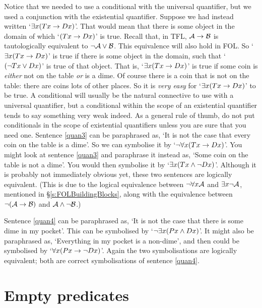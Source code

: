 Notice that we needed to use a conditional with the universal quantifier, but we used a conjunction with the existential quantifier. Suppose we had instead written `$\exists x(Tx \rightarrow Dx)$'. That would mean that there is some object in the domain of which `$(Tx \rightarrow Dx)$' is true. Recall that, in TFL, $\mathcal{A} \rightarrow \mathcal{B}$ is tautologically equivalent to $\neg\mathcal{A} \vee \mathcal{B}$. This equivalence will also hold in FOL. So `$\exists x(Tx \rightarrow Dx)$' is true if there is some object in the domain, such that `$(\neg Tx \vee Dx)$' is true of that object. That is, `$\exists x (Tx \rightarrow Dx)$' is true if some coin is \emph{either} not on the table \emph{or} is a dime. Of course there is a coin that is not on the table: there are coins lots of other places. So it is \emph{very easy} for `$\exists x(Tx \rightarrow Dx)$' to be true. A conditional will usually be the natural connective to use with a universal quantifier, but a conditional within the scope of an existential quantifier tends to say something very weak indeed. As a general rule of thumb, do not put conditionals in the scope of existential quantifiers unless you are sure that you need one.
Sentence \ref{quan3} can be paraphrased as, `It is not the case that every coin on the table is a dime'. So we can symbolise it by `$\neg \forall x(Tx \rightarrow Dx)$'. You might look at sentence \ref{quan3} and paraphrase it instead as, `Some coin on the table is not a dime'. You would then symbolise it by `$\exists x(Tx \wedge \neg Dx)$'. Although it is probably not immediately obvious yet, these two sentences are logically equivalent. (This is due to the logical equivalence between $\neg\forall x\mathcal{A}$ and $\exists x\neg\mathcal{A}$, mentioned in \S\ref{s:FOLBuildingBlocks}, along with the equivalence between $\neg(\mathcal{A}\rightarrow\mathcal{B})$ and $\mathcal{A}\wedge\neg\mathcal{B}$.)

Sentence \ref{quan4} can be paraphrased as, `It is not the case that there is some dime in my pocket'. This can be symbolised by `$\neg\exists x(Px \wedge Dx)$'. It might also be paraphrased as, `Everything in my pocket is a non-dime', and then could be symbolised by `$\forall x(Px \rightarrow \neg Dx)$'. Again the two symbolisations are logically equivalent; both are correct symbolisations of sentence \ref{quan4}.


\section{Empty predicates}

